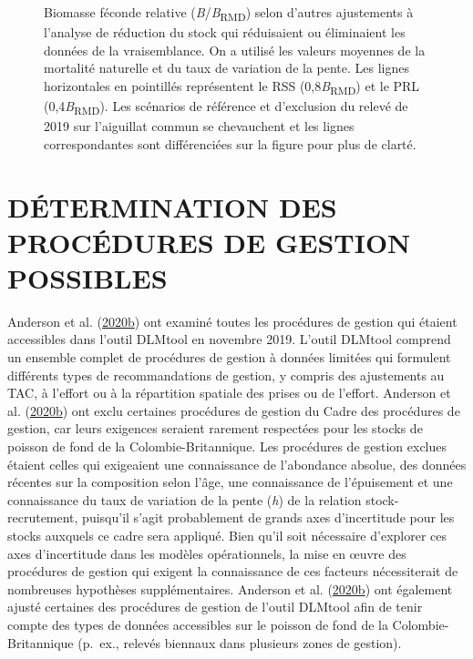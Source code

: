 \documentclass[french,11pt]{book}
\begin{document}
\begin{figure}[htb]

{\centering {} 

}

\caption{Biomasse féconde relative (\emph{B}/\emph{B}\textsubscript{RMD}) selon d'autres ajustements à l'analyse de réduction du stock qui réduisaient ou éliminaient les données de la vraisemblance. On a utilisé les valeurs moyennes de la mortalité naturelle et du taux de variation de la pente. Les lignes horizontales en pointillés représentent le RSS (0,8\emph{B}\textsubscript{RMD}) et le PRL (0,4\emph{B}\textsubscript{RMD}). Les scénarios de référence et d'exclusion du relevé de 2019 sur l'aiguillat commun se chevauchent et les lignes correspondantes sont différenciées sur la figure pour plus de clarté.}\label{fig:alt-SRA-fit}
\end{figure}
\clearpage

\hypertarget{sec:mp}{%
\section{DÉTERMINATION DES PROCÉDURES DE GESTION POSSIBLES}\label{sec:mp}}

Anderson et al. (\protect\hyperlink{ref-anderson2020gfmp}{2020b}) ont examiné toutes les procédures de gestion qui étaient accessibles dans l'outil DLMtool en novembre 2019. L'outil DLMtool comprend un ensemble complet de procédures de gestion à données limitées qui formulent différents types de recommandations de gestion, y compris des ajustements au TAC, à l'effort ou à la répartition spatiale des prises ou de l'effort. Anderson et al. (\protect\hyperlink{ref-anderson2020gfmp}{2020b}) ont exclu certaines procédures de gestion du Cadre des procédures de gestion, car leurs exigences seraient rarement respectées pour les stocks de poisson de fond de la Colombie-Britannique. Les procédures de gestion exclues étaient celles qui exigeaient une connaissance de l'abondance absolue, des données récentes sur la composition selon l'âge, une connaissance de l'épuisement et une connaissance du taux de variation de la pente (\emph{h}) de la relation stock-recrutement, puisqu'il s'agit probablement de grands axes d'incertitude pour les stocks auxquels ce cadre sera appliqué. Bien qu'il soit nécessaire d'explorer ces axes d'incertitude dans les modèles opérationnels, la mise en œuvre des procédures de gestion qui exigent la connaissance de ces facteurs nécessiterait de nombreuses hypothèses supplémentaires. Anderson et al. (\protect\hyperlink{ref-anderson2020gfmp}{2020b}) ont également ajusté certaines des procédures de gestion de l'outil DLMtool afin de tenir compte des types de données accessibles sur le poisson de fond de la Colombie-Britannique (p.~ex., relevés biennaux dans plusieurs zones de gestion).
\end{document}
